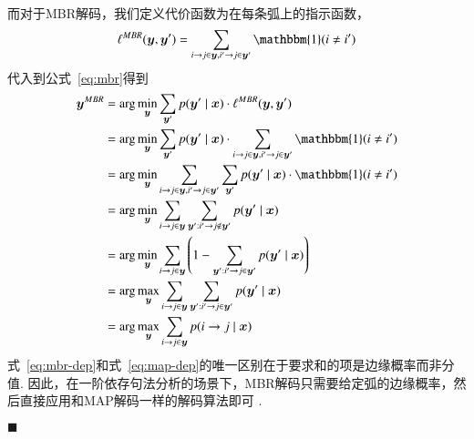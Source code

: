 而对于MBR解码，我们定义代价函数为在每条弧上的指示函数，
\begin{equation}
	\ell^{MBR}(\boldsymbol{y},\boldsymbol{y}^{\prime}) = \sum_{i\rightarrow j\in\boldsymbol{y},i^{\prime}\rightarrow j\in\boldsymbol{y}^{\prime}}\mathbbm{1}(i\neq i^{\prime})
\end{equation}
代入到公式~\ref{eq:mbr}得到
\begin{equation}
	\label{eq:mbr-dep}
	\begin{split}
		\boldsymbol{y}^{MBR}&= \arg\min_{\boldsymbol{y}}\sum_{\boldsymbol{y}^{\prime}}p(\boldsymbol{y}^{\prime}\mid\boldsymbol{x})\cdot\ell^{MBR}(\boldsymbol{y},\boldsymbol{y}^{\prime})\\
		&=\arg\min_{\boldsymbol{y}}\sum_{\boldsymbol{y}^{\prime}}p(\boldsymbol{y}^{\prime}\mid\boldsymbol{x})\cdot\sum_{i\rightarrow j\in\boldsymbol{y},i^{\prime}\rightarrow j\in\boldsymbol{y}^{\prime}}\mathbbm{1}(i\neq i^{\prime})\\
		&=\arg\min_{\boldsymbol{y}}\sum_{i\rightarrow j\in\boldsymbol{y},i^{\prime}\rightarrow j\in\boldsymbol{y}^{\prime}}\sum_{\boldsymbol{y}^{\prime}}p(\boldsymbol{y}^{\prime}\mid\boldsymbol{x})\cdot\mathbbm{1}(i\neq i^{\prime})\\
		&=\arg\min_{\boldsymbol{y}}\sum_{i\rightarrow j\in\boldsymbol{y}}\sum_{\boldsymbol{y}^{\prime}:i^{\prime}\rightarrow j\notin \boldsymbol{y}^{\prime}}p(\boldsymbol{y}^{\prime}\mid\boldsymbol{x})\\
		&=\arg\min_{\boldsymbol{y}}\sum_{i\rightarrow j\in\boldsymbol{y}}\left(1-\sum_{\boldsymbol{y}^{\prime}:i^{\prime}\rightarrow j\in \boldsymbol{y}^{\prime}}p(\boldsymbol{y}^{\prime}\mid\boldsymbol{x})\right)\\
		&=\arg\max_{\boldsymbol{y}}\sum_{i\rightarrow j\in\boldsymbol{y}}\sum_{\boldsymbol{y}^{\prime}:i^{\prime}\rightarrow j\in \boldsymbol{y}^{\prime}}p(\boldsymbol{y}^{\prime}\mid\boldsymbol{x})\\
		&=\arg\max_{\boldsymbol{y}}\sum_{i\rightarrow j\in\boldsymbol{y}}p(i\rightarrow j\mid\boldsymbol{x})
	\end{split}
\end{equation}
式~\ref{eq:mbr-dep}和式~\ref{eq:map-dep}的唯一区别在于要求和的项是边缘概率而非分值.
因此，在一阶依存句法分析的场景下，MBR解码只需要给定弧的边缘概率，然后直接应用和MAP解码一样的解码算法即可 \citep{smith-smith-2007-probabilistic, smith-2011-linguistic}.

\noindent$\blacksquare$